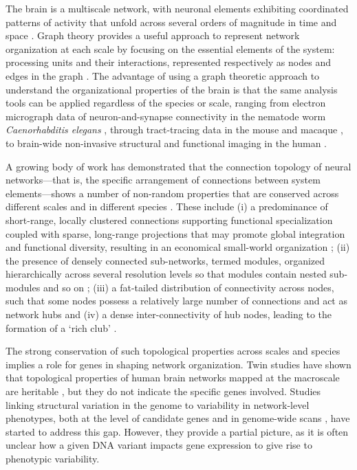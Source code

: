 The brain is a multiscale network, with neuronal elements exhibiting coordinated patterns of activity that unfold across several orders of magnitude in time and space \citep{Buzsaki2004,Lichtman2011,Fornito2016}.
Graph theory provides a useful approach to represent network organization at each scale by focusing on the essential elements of the system: processing units and their interactions, represented respectively as nodes and edges in the graph \citep{Bullmore2009,Fornito2016}.
The advantage of using a graph theoretic approach to understand the organizational properties of the brain is that the same analysis tools can be applied regardless of the species or scale, ranging from electron micrograph data of neuron-and-synapse connectivity in the nematode worm \textit{Caenorhabditis elegans} \citep{White1986,Varshney2011}, through tract-tracing data in the mouse \citep{Oh2014,Gamanut2018} and macaque \citep{Stephan2001,Markov2014}, to brain-wide non-invasive structural and functional imaging in the human \citep{Bassett2009a,Bullmore2009,Fornito2013}.

A growing body of work has demonstrated that the connection topology of neural networks---that is, the specific arrangement of connections between system elements---shows a number of non-random properties that are conserved across different scales and in different species \citep{Bullmore2009,Sporns2011,Fornito2016,VandenHeuvel2016,Schroter2017}. These include (i) a predominance of short-range, locally clustered connections supporting functional specialization coupled with sparse, long-range projections that may promote global integration and functional diversity, resulting in an economical small-world organization \citep{Watts1998,Bassett2017,Betzel2017}; (ii) the presence of densely connected sub-networks, termed modules, organized hierarchically across several resolution levels so that modules contain nested sub-modules and so on \citep{Meunier2009,Bassett2010}; (iii) a fat-tailed distribution of connectivity across nodes, such that some nodes possess a relatively large number of connections and act as network hubs  \citep{VandenHeuvel2011,Towlson2013,VandenHeuvel2016} and (iv) a dense inter-connectivity of hub nodes, leading to the formation of a `rich club' \citep{Zamora-Lopez2010,VandenHeuvel2011,Harriger2012,Towlson2013}.

The strong conservation of such topological properties across scales and species implies a role for genes in shaping network organization. Twin studies have shown that topological properties of human brain networks mapped at the macroscale are heritable \citep{Smit2008,Fornito2011,VandenHeuvel2013e,Bohlken2014,Sinclair2015,Zhan2015,Colclough2017}, but they do not indicate the specific genes involved. Studies linking structural variation in the genome to variability in network-level phenotypes, both at the level of candidate genes \citep{Liu2010,Brown2011,Dennis2011,Markett2017} and in genome-wide scans \citep{Jahanshad2013}, have started to address this gap. However, they provide a partial picture, as it is often unclear how a given DNA variant impacts gene expression to give rise to phenotypic variability.

